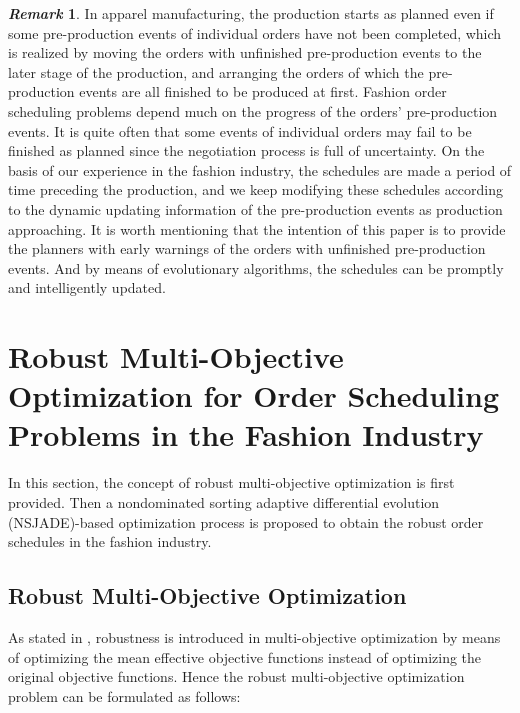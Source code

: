\documentclass[journal]{IEEEtran}
\theoremstyle{definition}
\newtheorem{remark}{\it Remark}
\begin{document}
\begin{remark}
In apparel manufacturing, the production starts as planned even if some pre-production events of individual orders have not been completed, which is realized by moving the orders with unfinished pre-production events to the later stage of the production, and arranging the orders of which the pre-production events are all finished to be produced at first.
Fashion order scheduling problems depend much on the progress of the orders' pre-production events. It is quite often that some events of individual orders may fail to be finished as planned since the negotiation process is full of uncertainty. On the basis of our experience in the fashion industry, the schedules are made a period of time preceding the production, and we keep modifying these schedules according to the dynamic updating information of the pre-production events as production approaching. It is worth mentioning that the intention of this paper is to provide the planners with early warnings of the orders with unfinished pre-production events. And by means of evolutionary algorithms, the schedules can be promptly and intelligently updated.
\end{remark}

\section{Robust Multi-Objective Optimization for Order Scheduling Problems in the Fashion Industry}
In this section, the concept of robust multi-objective optimization is first provided. Then a nondominated sorting adaptive differential evolution (NSJADE)-based optimization process is proposed to obtain the robust order schedules in the fashion industry.

\subsection{Robust Multi-Objective Optimization}\label{defH}
As stated in \cite{deb2006introducing}, robustness is introduced in multi-objective optimization by means of optimizing the mean effective objective functions instead of optimizing the original objective functions. Hence the robust multi-objective optimization problem can be formulated as follows:
\end{document}
